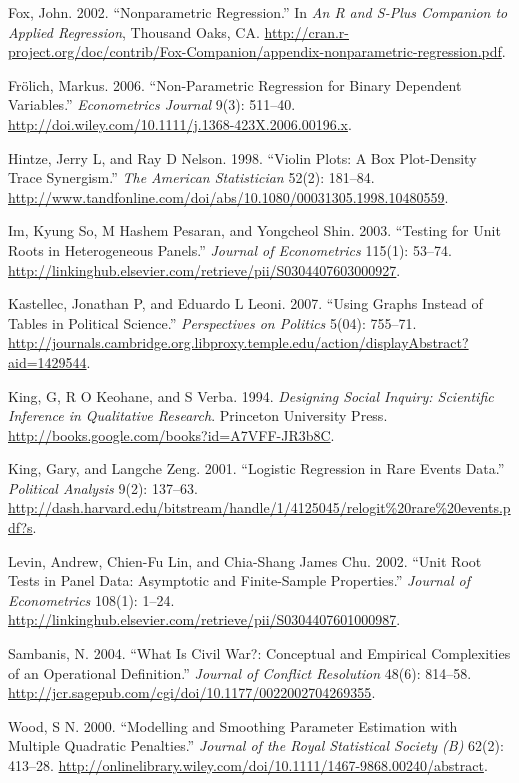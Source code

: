 \documentclass[11pt,article,oneside]{memoir}
\begin{document}
Fox, John. 2002. ``Nonparametric Regression.'' In \emph{An R and S-Plus
Companion to Applied Regression}, Thousand Oaks, CA.
\url{http://cran.r-project.org/doc/contrib/Fox-Companion/appendix-nonparametric-regression.pdf}.

Fr{ö}lich, Markus. 2006. ``Non-Parametric Regression for Binary
Dependent Variables.'' \emph{Econometrics Journal} 9(3): 511--40.
\url{http://doi.wiley.com/10.1111/j.1368-423X.2006.00196.x}.

Hintze, Jerry L, and Ray D Nelson. 1998. ``Violin Plots: A Box
Plot-Density Trace Synergism.'' \emph{The American Statistician} 52(2):
181--84.
\url{http://www.tandfonline.com/doi/abs/10.1080/00031305.1998.10480559}.

Im, Kyung So, M Hashem Pesaran, and Yongcheol Shin. 2003. ``Testing for
Unit Roots in Heterogeneous Panels.'' \emph{Journal of Econometrics}
115(1): 53--74.
\url{http://linkinghub.elsevier.com/retrieve/pii/S0304407603000927}.

Kastellec, Jonathan P, and Eduardo L Leoni. 2007. ``Using Graphs Instead
of Tables in Political Science.'' \emph{Perspectives on Politics} 5(04):
755--71.
\url{http://journals.cambridge.org.libproxy.temple.edu/action/displayAbstract?aid=1429544}.

King, G, R O Keohane, and S Verba. 1994. \emph{Designing Social Inquiry:
Scientific Inference in Qualitative Research}. Princeton University
Press. \url{http://books.google.com/books?id=A7VFF-JR3b8C}.

King, Gary, and Langche Zeng. 2001. ``Logistic Regression in Rare Events
Data.'' \emph{Political Analysis} 9(2): 137--63.
\url{http://dash.harvard.edu/bitstream/handle/1/4125045/relogit\%20rare\%20events.pdf?s}.

Levin, Andrew, Chien-Fu Lin, and Chia-Shang James Chu. 2002. ``Unit Root
Tests in Panel Data: Asymptotic and Finite-Sample Properties.''
\emph{Journal of Econometrics} 108(1): 1--24.
\url{http://linkinghub.elsevier.com/retrieve/pii/S0304407601000987}.

Sambanis, N. 2004. ``What Is Civil War?: Conceptual and Empirical
Complexities of an Operational Definition.'' \emph{Journal of Conflict
Resolution} 48(6): 814--58.
\url{http://jcr.sagepub.com/cgi/doi/10.1177/0022002704269355}.

Wood, S N. 2000. ``Modelling and Smoothing Parameter Estimation with
Multiple Quadratic Penalties.'' \emph{Journal of the Royal Statistical
Society (B)} 62(2): 413--28.
\url{http://onlinelibrary.wiley.com/doi/10.1111/1467-9868.00240/abstract}.
\end{document}
